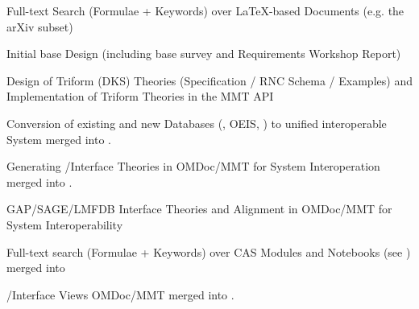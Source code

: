 \begin{workpackage}[id=dksbases,%
  title=Data/Knowledge/Software-Bases,lead=FAU,
  ZHRM=12,JURM=12,FAURM=34,UWRM=25,SARM=10,LLRM=2,PSRM=25]
\begin{wpdelivs}
\begin{wpdeliv}[id=mws,miles=startup,due=9,nature=OTHER,dissem=PU,lead=JU,issue=133, status=submitted]
    {Full-text Search (Formulae + Keywords) over LaTeX-based Documents
      (e.g. the arXiv subset)}
  \end{wpdeliv}
  \begin{wpdeliv}[due=12,miles=startup,id=design,dissem=PU,nature=R,lead=JU,issue=136, status=submitted]
    {Initial \DKS base Design (including base survey and Requirements Workshop Report)}
  \end{wpdeliv}
  \begin{wpdeliv}[due=15,miles=proto1,id=dkstheories,dissem=PU,nature=R,lead=JU,issue=137, status=submitted]
    {Design of Triform (DKS) Theories (Specification / RNC Sche\-ma / Examples) and 
      Implementation of Triform Theories in the MMT API}
  \end{wpdeliv}
  \begin{wpdeliv}[due=24,id=conv,dissem=PU,nature=DEC,lead=ZH,issue=138,status=canceled]
    {Conversion of existing and new Databases (\LMFDB, OEIS, \FindStat) to unified interoperable
      System}
    merged into .
  \end{wpdeliv}
  \begin{wpdeliv}[due=24,id=psfoundation,dissem=PU,nature=OTHER,lead=FAU,issue=139,status=canceled]
    {Generating \GAP/\Sage Interface Theories in OMDoc/MMT for System Interoperation}
    merged into .
  \end{wpdeliv}
  \begin{wpdeliv}[due=30,miles=WP6interop1,id=interface-theories,dissem=PU,nature=OTHER,lead=FAU]
    {GAP/SAGE/LMFDB Interface Theories and Alignment in OMDoc/MMT for System
      Interoperability}
  \end{wpdeliv}
  \begin{wpdeliv}[id=notebooksearch,due=30,nature=OTHER,dissem=PU,lead=FAU,issue=140,status=canceled]
    {Full-text search (Formulae + Keywords) over CAS Modules and Notebooks} (see
      )
    merged into 
  \end{wpdeliv}
  \begin{wpdeliv}[due=36,id=pssem,dissem=PU,nature=OTHER,lead=FAU,issue=141,status=canceled]
    {\GAP/\Sage Interface Views OMDoc/MMT}
    merged into .
  \end{wpdeliv}

\end{wpdelivs}
\end{workpackage}
